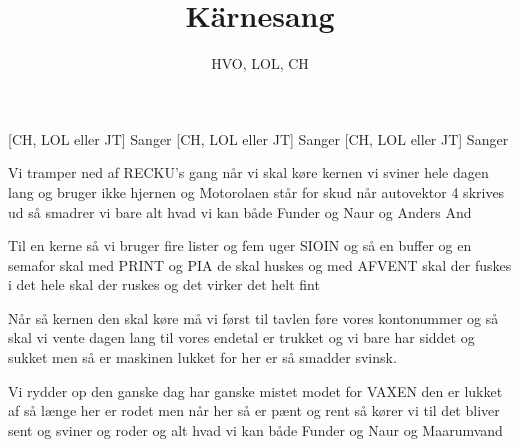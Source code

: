 \documentclass[a4paper,11pt]{article}
\title{Kärnesang}
\author{HVO, LOL, CH}
\begin{document}
\maketitle

\begin{roles}
[CH, LOL eller JT] Sanger
[CH, LOL eller JT] Sanger
[CH, LOL eller JT] Sanger
\end{roles}


\begin{song}
%
Vi tramper ned af RECKU's gang
når vi skal køre kernen
vi sviner hele dagen lang
og bruger ikke hjernen
og Motorolaen står for skud
når autovektor 4 skrives ud
så smadrer vi bare alt hvad vi kan
både Funder og Naur og Anders And

%
Til en kerne så vi bruger
fire lister og fem uger
SIOIN og så en buffer og en semafor skal med
PRINT og PIA de skal huskes
og med AFVENT skal der fuskes
i det hele skal der ruskes
og det virker det helt fint

%
Når så kernen den skal køre
må vi først til tavlen føre
vores kontonummer og så skal vi vente dagen lang
til vores endetal er trukket og vi bare har siddet og sukket
men så er maskinen lukket
for her er så smadder svinsk.

%
Vi rydder op den ganske dag
har ganske mistet modet
for VAXEN den er lukket af
så længe her er rodet
%
men når her så er pænt og rent
så kører vi til det bliver sent
og sviner og roder og alt hvad vi kan
både Funder og Naur og Maarumvand
\end{song}
\end{document}
